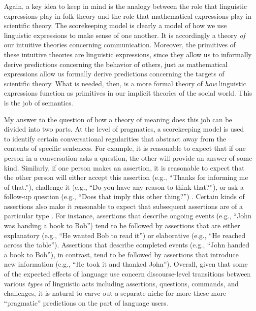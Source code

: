 Again, a key idea to keep in mind is the analogy between the role that linguistic expressions play in folk theory and the role that mathematical expressions play in scientific theory. The scorekeeping model is clearly a model of how we use linguistic expressions to make sense of one another. It is accordingly a theory \textit{of} our intuitive theories concerning communication. Moreover, the primitives of these intuitive theories are linguistic expressions, since they allow us to informally derive predictions concerning the behavior of others, just as mathematical expressions allow us formally derive predictions concerning the targets of scientific theory. What is needed, then, is a more formal theory of \textit{how} linguistic expressions function as primitives in our implicit theories of the social world. This is the job of semantics.

My answer to the question of how a theory of meaning does this job can be divided into two parts. At the level of pragmatics, a scorekeeping model is used to identify certain conversational regularities that abstract away from the contents of specific sentences. For example, it is reasonable to expect that if one person in a conversation asks a question, the other will provide an answer of some kind. Similarly, if one person makes an assertion, it is reasonable to expect that the other person will either accept this assertion (e.g., ``Thanks for informing me of that.''), challenge it (e.g., ``Do you have any reason to think that?''), or ask a follow-up question (e.g., ``Does that imply this other thing?'') \citep[][Ch. 3]{Brandom:1994}. Certain kinds of assertions also make it reasonable to expect that subsequent assertions are of a particular type \citep{Rohde:2008}. For instance, assertions that describe ongoing events (e.g., ``John was handing a book to Bob'') tend to be followed by assertions that are either explanatory (e.g., ``He wanted Bob to read it'') or elaborative (e.g., ``He reached across the table''). Assertions that describe completed events (e.g., ``John handed a book to Bob''), in contrast, tend to be followed by assertions that introduce new information (e.g., ``He took it and thanked John''). Overall, given that some of the expected effects of language use concern discourse-level transitions between various \textit{types} of linguistic acts including assertions, questions, commands, and challenges, it is natural to carve out a separate niche for more these more ``pragmatic'' predictions on the part of language users. 

